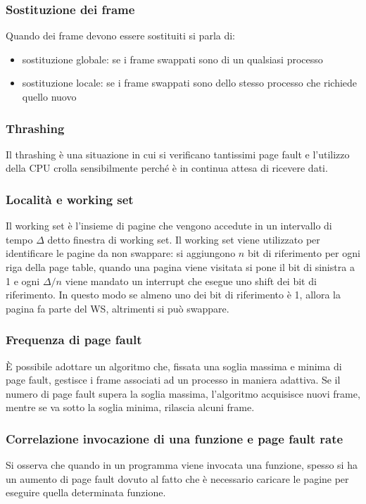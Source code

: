 \documentclass[a4paper]{article}
\begin{document}
\subsubsection*{Sostituzione dei frame}
Quando dei frame devono essere sostituiti si parla di:
\begin{itemize}
	\item sostituzione globale: se i frame swappati sono di un qualsiasi processo
	\item sostituzione locale: se i frame swappati sono dello stesso processo che richiede quello nuovo
\end{itemize}

\subsubsection*{Thrashing}
Il thrashing è una situazione in cui si verificano tantissimi page fault e l'utilizzo della CPU crolla sensibilmente perché
è in continua attesa di ricevere dati.

\subsubsection*{Località e working set}
Il working set è l'insieme di pagine che vengono accedute in un intervallo di tempo \(\Delta\) detto finestra di working set.
Il working set viene utilizzato per identificare le pagine da non swappare: si aggiungono \(n\) bit di riferimento per ogni riga
della page table, quando una pagina viene visitata si pone il bit di sinistra a 1 e ogni \(\Delta/n\) viene mandato un interrupt
che esegue uno shift dei bit di riferimento. In questo modo se almeno uno dei bit di riferimento è 1, allora la pagina fa parte
del WS, altrimenti si può swappare.

\subsubsection*{Frequenza di page fault}
È possibile adottare un algoritmo che, fissata una soglia massima e minima di page fault, gestisce i frame associati ad un
processo in maniera adattiva. Se il numero di page fault supera la soglia massima, l'algoritmo acquisisce nuovi frame, mentre
se va sotto la soglia minima, rilascia alcuni frame.

\subsubsection*{Correlazione invocazione di una funzione e page fault rate}
Si osserva che quando in un programma viene invocata una funzione, spesso si ha un aumento di page fault dovuto al fatto che è
necessario caricare le pagine per eseguire quella determinata funzione.
\end{document}
